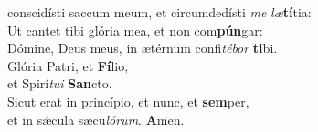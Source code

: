 \evenverse conscidísti saccum meum, et circumdedísti \textit{me} \textit{læ}\textbf{tí}tia:\\
\oddverse Ut cantet tibi glória mea, et non com\textbf{pún}gar:~\*\\
\oddverse Dómine, Deus meus, in ætérnum confi\textit{té}\textit{bor} \textbf{ti}bi.\\
\evenverse Glória Patri, et \textbf{Fí}lio,~\*\\
\evenverse et Spirí\textit{tu}\textit{i} \textbf{San}cto.\\
\oddverse Sicut erat in princípio, et nunc, et \textbf{sem}per,~\*\\
\oddverse et in sǽcula sæcu\textit{ló}\textit{rum}. \textbf{A}men.\\
